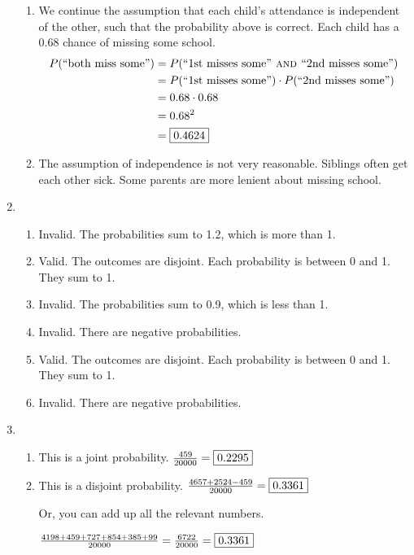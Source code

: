 \documentclass[12pt,letterpaper]{article}
\begin{document}
\begin{enumerate}
\begin{enumerate}
\item We continue the assumption that each child's attendance is independent of the other, such that the probability above is correct. Each child has a 0.68 chance of missing some school.
\begin{align*}
P(\text{``both miss some''}) &= P(\text{``1st misses some''} \textsc{~and~} \text{``2nd misses some''})\\
&= P(\text{``1st misses some''}) \cdot P(\text{``2nd misses some''})\\
&= 0.68 \cdot 0.68\\
&= 0.68^2\\
&= \fbox{0.4624}
\end{align*}

\item The assumption of independence is not very reasonable. Siblings often get each other sick. Some parents are more lenient about missing school.
\end{enumerate}

\item \begin{enumerate}
\item Invalid. The probabilities sum to 1.2, which is more than 1.
\item Valid. The outcomes are disjoint. Each probability is between 0 and 1. They sum to 1. 
\item Invalid. The probabilities sum to 0.9, which is less than 1.
\item Invalid. There are negative probabilities.
\item Valid. The outcomes are disjoint. Each probability is between 0 and 1. They sum to 1.
\item Invalid. There are negative probabilities.
\end{enumerate}

\item \begin{enumerate}
\item This is a joint probability. $\frac{459}{20000} = \fbox{0.2295}$
\item This is a disjoint probability. $\frac{4657+2524-459}{20000} = \fbox{0.3361}$

Or, you can add up all the relevant numbers.

$\frac{4198+459+727+854+385+99}{20000} = \frac{6722}{20000} = \fbox{0.3361}$
\end{enumerate}


\end{enumerate}
\end{document}
